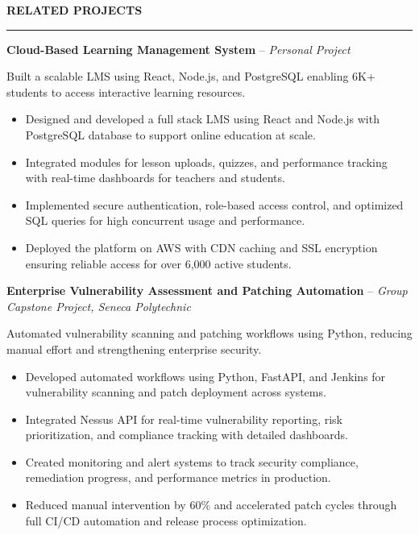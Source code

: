 \documentclass[10pt,letterpaper]{article}
\begin{document}
\vspace{6pt}

\textbf{RELATED PROJECTS}\\[-8pt]
\noindent\rule{\textwidth}{1pt}

\vspace{-2pt}

\textbf{Cloud-Based Learning Management System} -- \emph{Personal Project}

\vspace{-1pt}

Built a scalable LMS using React, Node.js, and PostgreSQL enabling 6K+ students to access interactive learning resources.
\vspace{-1pt}
\begin{itemize}
\item Designed and developed a full stack LMS using React and Node.js with PostgreSQL database to support online education at scale.
\item Integrated modules for lesson uploads, quizzes, and performance tracking with real-time dashboards for teachers and students.
\item Implemented secure authentication, role-based access control, and optimized SQL queries for high concurrent usage and performance.
\item Deployed the platform on AWS with CDN caching and SSL encryption ensuring reliable access for over 6,000 active students.
\end{itemize}

\textbf{Enterprise Vulnerability Assessment and Patching Automation} -- \emph{Group Capstone Project, Seneca Polytechnic}

\vspace{-1pt}

Automated vulnerability scanning and patching workflows using Python, reducing manual effort and strengthening enterprise security.
\vspace{-1pt}
\begin{itemize}
\item Developed automated workflows using Python, FastAPI, and Jenkins for vulnerability scanning and patch deployment across systems.
\item Integrated Nessus API for real-time vulnerability reporting, risk prioritization, and compliance tracking with detailed dashboards.
\item Created monitoring and alert systems to track security compliance, remediation progress, and performance metrics in production.
\item Reduced manual intervention by 60\% and accelerated patch cycles through full CI/CD automation and release process optimization.
\end{itemize}
\end{document}
